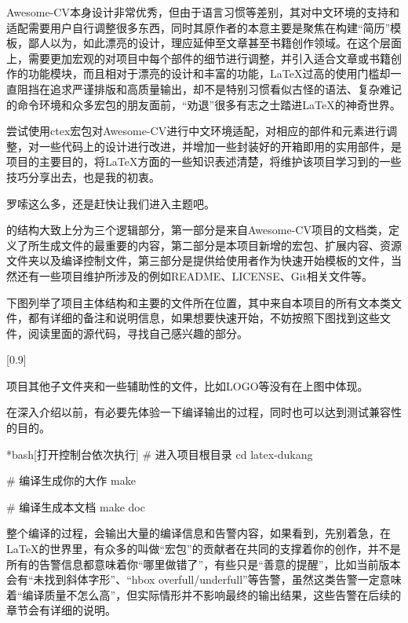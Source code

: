 Awesome-CV本身设计非常优秀，但由于语言习惯等差别，其对中文环境的支持和适配需要用户自行调整很多东西，同时其原作者的本意主要是聚焦在构建“简历”模板，鄙人以为，如此漂亮的设计，理应延伸至文章甚至书籍创作领域。在这个层面上，需要更加宏观的对项目中每个部件的细节进行调整，并引入适合文章或书籍创作的功能模块，而且相对于漂亮的设计和丰富的功能，{\LaTeX}过高的使用门槛却一直阻挡在追求严谨排版和高质量输出，却不是特别习惯看似古怪的语法、复杂难记的命令环境和众多宏包的朋友面前，“劝退”很多有志之士踏进{\LaTeX}的神奇世界。

尝试使用ctex宏包对Awesome-CV进行中文环境适配，对相应的部件和元素进行调整，对一些代码上的设计进行改进，并增加一些封装好的开箱即用的实用部件，是{\dk}项目的主要目的，将{\LaTeX}方面的一些知识表述清楚，将维护该项目学习到的一些技巧分享出去，也是我的初衷。

罗嗦这么多，还是赶快让我们进入主题吧。

{\dk}的结构大致上分为三个逻辑部分，第一部分是来自Awesome-CV项目的文档类，定义了所生成文件的最重要的内容，第二部分是本项目新增的宏包、扩展内容、资源文件夹以及编译控制文件，第三部分是提供给使用者作为快速开始模板的文件，当然还有一些项目维护所涉及的例如README、LICENSE、Git相关文件等。

下图列举了项目主体结构和主要的文件所在位置，其中来自本项目的所有文本类文件，都有详细的备注和说明信息，如果想要{\color{awesome}快速开始}，不妨按照下图找到这些文件，阅读里面的源代码，寻找自己感兴趣的部分。

[0.9]

\begin{dkcomment}
  项目其他子文件夹和一些辅助性的文件，比如LOGO等没有在上图中体现。
\end{dkcomment}


在深入介绍以前，有必要先体验一下编译输出的过程，同时也可以达到测试兼容性的目的。

\begin{dkcode}*{bash}[打开控制台依次执行]
# 进入项目根目录
cd latex-dukang

# 编译生成你的大作
make

# 编译生成本文档
make doc
\end{dkcode}

整个编译的过程，会输出大量的编译信息和告警内容，如果看到，先别着急，在{\LaTeX}的世界里，有众多的叫做“宏包”的贡献者在共同的支撑着你的创作，并不是所有的告警信息都意味着你“哪里做错了”，有些只是“善意的提醒”，比如{\dk}当前版本会有“未找到斜体字形”、“hbox overfull/underfull”等告警，虽然这类告警一定意味着“编译质量不怎么高”，但实际情形并不影响最终的输出结果，这些告警在后续的章节会有详细的说明。

